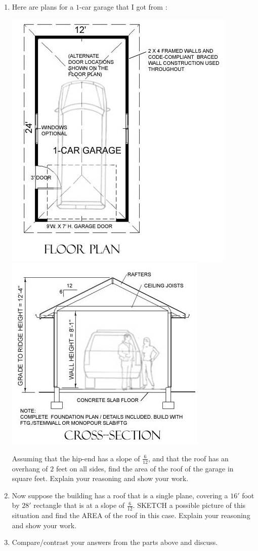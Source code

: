 \documentclass[hints,nooutcomes,noauthor,handout,12pt]{ximera}
\begin{document}
 \begin{question}
\begin{enumerate}
\item Here are plans for a $1$-car garage that I got from :
   \begin{center}
     \includegraphics[width=.4\textwidth]{oneCarGarage.jpeg}
    \includegraphics[width=.35\textwidth]{oneCarGarageFront.jpeg}
   \end{center}
   Assuming that the hip-end has a slope of $\frac{6}{12}$, and that
   the roof has an overhang of $2$ feet on all sides, find the area of
   the roof of the garage in square feet.  Explain your reasoning and
   show your work. %
 \item Now suppose the building has a roof that is a single plane,
   covering a $16'$ foot by $28'$ rectangle that is at a slope of
   $\frac{6}{12}$. SKETCH a possible picture of this situation and
   find the AREA of the roof in this case. Explain your reasoning and
   show your work.
\item Compare/contrast your answers from the parts above and discuss. 
   
\end{enumerate}


\end{question}
\end{document}
